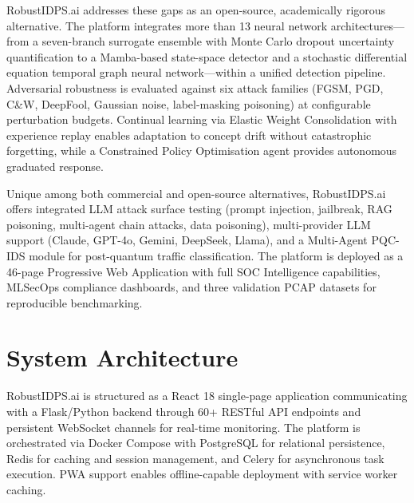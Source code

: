 \documentclass[11pt,a4paper]{article}
\begin{document}
RobustIDPS.ai addresses these gaps as an open-source, academically rigorous alternative.  The platform integrates more than 13 neural network architectures---from a seven-branch surrogate ensemble with Monte Carlo dropout uncertainty quantification to a Mamba-based state-space detector and a stochastic differential equation temporal graph neural network---within a unified detection pipeline.  Adversarial robustness is evaluated against six attack families (FGSM, PGD, C\&W, DeepFool, Gaussian noise, label-masking poisoning) at configurable perturbation budgets.  Continual learning via Elastic Weight Consolidation with experience replay enables adaptation to concept drift without catastrophic forgetting, while a Constrained Policy Optimisation agent provides autonomous graduated response.

Unique among both commercial and open-source alternatives, RobustIDPS.ai offers integrated LLM attack surface testing (prompt injection, jailbreak, RAG poisoning, multi-agent chain attacks, data poisoning), multi-provider LLM support (Claude, GPT-4o, Gemini, DeepSeek, Llama), and a Multi-Agent PQC-IDS module for post-quantum traffic classification.  The platform is deployed as a 46-page Progressive Web Application with full SOC Intelligence capabilities, MLSecOps compliance dashboards, and three validation PCAP datasets for reproducible benchmarking.
\section{System Architecture}
\label{sec:architecture}
RobustIDPS.ai is structured as a React 18 single-page application communicating with a Flask/Python backend through 60+ RESTful API endpoints and persistent WebSocket channels for real-time monitoring.  The platform is orchestrated via Docker Compose with PostgreSQL for relational persistence, Redis for caching and session management, and Celery for asynchronous task execution.  PWA support enables offline-capable deployment with service worker caching.
\end{document}
